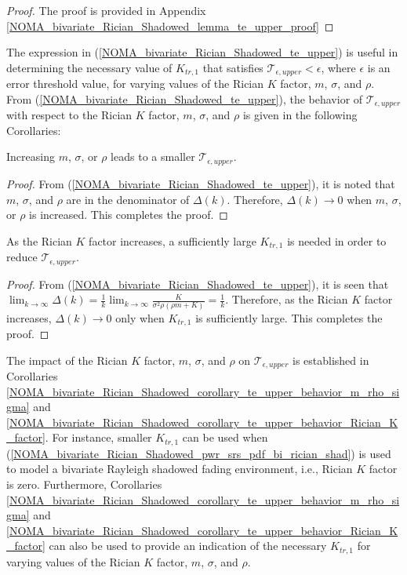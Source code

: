 \begin{proof}
The proof is provided in Appendix \ref{NOMA_bivariate_Rician_Shadowed_lemma_te_upper_proof}
\end{proof}

The expression in (\ref{NOMA_bivariate_Rician_Shadowed_te_upper}) is useful in determining the necessary value of $K_{tr,1}$ that satisfies $\mathcal{T}_{\epsilon,upper} < \epsilon$, where $\epsilon$ is an error threshold value, for varying values of the Rician $K$ factor, $m$, $\sigma$, and $\rho$. From (\ref{NOMA_bivariate_Rician_Shadowed_te_upper}), the behavior of $\mathcal{T}_{\epsilon,upper}$ with respect to the Rician $K$ factor, $m$, $\sigma$, and $\rho$ is given in the following Corollaries:
\begin{corollary} \label{NOMA_bivariate_Rician_Shadowed_corollary_te_upper_behavior_m_rho_sigma}
Increasing $m$, $\sigma$, or $\rho$ leads to a smaller $\mathcal{T}_{\epsilon,upper}$.
\end{corollary}
\begin{proof}
From (\ref{NOMA_bivariate_Rician_Shadowed_te_upper}), it is noted that $m$, $\sigma$, and $\rho$ are in the denominator of $\Delta(k)$. Therefore, $\Delta(k) \to 0$ when $m$, $\sigma$, or $\rho$ is increased. This completes the proof.
\end{proof}
\begin{corollary} \label{NOMA_bivariate_Rician_Shadowed_corollary_te_upper_behavior_Rician_K_factor}
As the Rician $K$ factor increases, a sufficiently large $K_{tr,1}$ is needed in order to reduce $\mathcal{T}_{\epsilon,upper}$.
\end{corollary}
\begin{proof}
From (\ref{NOMA_bivariate_Rician_Shadowed_te_upper}), it is seen that $\lim_{k \to \infty} \Delta(k) = \frac{1}{k} \lim_{k \to \infty} \frac{K}{\sigma^2 \rho (\rho m + K)} = \frac{1}{k}$. Therefore, as the Rician $K$ factor increases, $\Delta(k) \to 0$ only when $K_{tr,1}$ is sufficiently large. This completes the proof.
\end{proof}

The impact of the Rician $K$ factor, $m$, $\sigma$, and $\rho$ on $\mathcal{T}_{\epsilon,upper}$ is established in Corollaries \ref{NOMA_bivariate_Rician_Shadowed_corollary_te_upper_behavior_m_rho_sigma} and \ref{NOMA_bivariate_Rician_Shadowed_corollary_te_upper_behavior_Rician_K_factor}. For instance, smaller $K_{tr,1}$ can be used when (\ref{NOMA_bivariate_Rician_Shadowed_pwr_srs_pdf_bi_rician_shad}) is used to model a bivariate Rayleigh shadowed fading environment, i.e., Rician $K$ factor is zero. Furthermore, Corollaries \ref{NOMA_bivariate_Rician_Shadowed_corollary_te_upper_behavior_m_rho_sigma} and \ref{NOMA_bivariate_Rician_Shadowed_corollary_te_upper_behavior_Rician_K_factor} can also be used to provide an indication of the necessary $K_{tr,1}$ for varying values of the Rician $K$ factor, $m$, $\sigma$, and $\rho$. 

